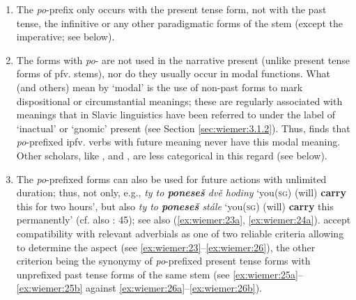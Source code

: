 \documentclass[output=paper,colorlinks,citecolor=brown]{langscibook}
\begin{document}
\begin{enumerate}[label=(\alph*)]
    \item \label{arg:a} The \textit{po}-prefix only occurs with the present tense form, not with the past tense, the infinitive or any other paradigmatic forms of the stem (except the imperative; see below).
    \item \label{arg:b} The forms with \textit{po}- are not used in the narrative present (unlike present tense forms of pfv. stems), nor do they usually occur in modal functions. What \citeauthor{Kopečný1962} (and others) mean by ‘modal’ is the use of non-past forms to mark dispositional or circumstantial meanings; these are regularly associated with meanings that in Slavic linguistics have been referred to under the label of ‘inactual’ or ‘gnomic’ present (see Section \ref{sec:wiemer:3.1.2}). Thus, \citet{Nerad1940} finds that \textit{po}-prefixed ipfv. verbs with future meaning never have this modal meaning. Other scholars, like \citet[529]{Bondarko1961}, \citet[47]{Kopečný1962} and \citet[439--441]{Machek1962}, are less categorical in this regard (see below).
    \item \label{arg:c} The \textit{po}-prefixed forms can also be used for future actions with unlimited duration; thus, not only, e.g., \textit{ty to \textbf{poneseš} dvě hodiny }‘you(\textsc{sg}) (will) \textbf{carry} this for two hours’, but also \textit{ty to \textbf{poneseš} stále }‘you(\textsc{sg}) (will) \textbf{carry} this permanently’ (cf. also \cite{Galton1976}: 45); see also (\ref{ex:wiemer:23a}, \ref{ex:wiemer:24a}). \citet[181]{ŠevčíkováPanevová2018} accept compatibility with relevant adverbials as one of two reliable criteria allowing to determine the aspect (see \ref{ex:wiemer:23}--\ref{ex:wiemer:26}), the other criterion being the synonymy of \textit{po}-prefixed present tense forms with unprefixed past tense forms of the same stem (see \ref{ex:wiemer:25a}--\ref{ex:wiemer:25b} against \ref{ex:wiemer:26a}--\ref{ex:wiemer:26b}).
\end{enumerate}
\end{document}
